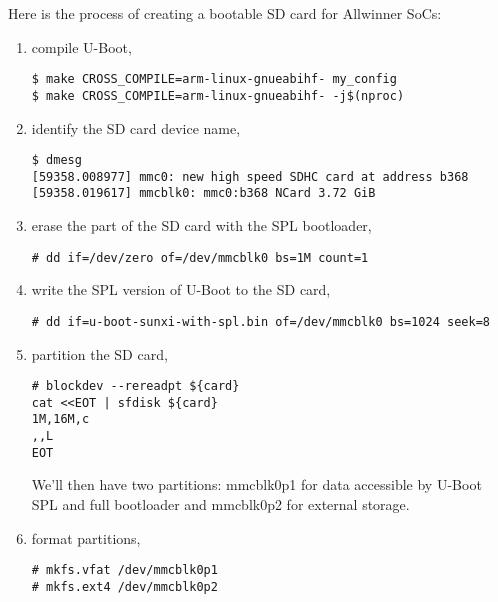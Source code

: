 Here is the process of creating a bootable SD card for Allwinner SoCs:
\begin{enumerate}
  \item compile U-Boot,

\begin{verbatim}
$ make CROSS_COMPILE=arm-linux-gnueabihf- my_config
$ make CROSS_COMPILE=arm-linux-gnueabihf- -j$(nproc)
\end{verbatim}

  \item identify the SD card device name,

\begin{verbatim}
$ dmesg
[59358.008977] mmc0: new high speed SDHC card at address b368
[59358.019617] mmcblk0: mmc0:b368 NCard 3.72 GiB
\end{verbatim}

  \item erase the part of the SD card with the SPL bootloader,

\begin{verbatim}
# dd if=/dev/zero of=/dev/mmcblk0 bs=1M count=1
\end{verbatim}

  \item write the SPL version of U-Boot to the SD card,

\begin{verbatim}
# dd if=u-boot-sunxi-with-spl.bin of=/dev/mmcblk0 bs=1024 seek=8
\end{verbatim}

  \item partition the SD card,

\begin{verbatim}
# blockdev --rereadpt ${card}
cat <<EOT | sfdisk ${card}
1M,16M,c
,,L
EOT
\end{verbatim}

We'll then have two partitions: mmcblk0p1 for data accessible by U-Boot SPL and full bootloader and mmcblk0p2 for external storage.

  \item format partitions,

\begin{verbatim}
# mkfs.vfat /dev/mmcblk0p1
# mkfs.ext4 /dev/mmcblk0p2
\end{verbatim}


\end{enumerate}
